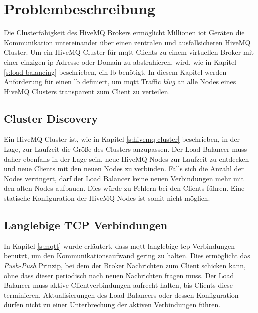 \section{Problembeschreibung} \label{s:problem}
Die Clusterfähigkeit des HiveMQ Brokers ermöglicht Millionen \ac{iot} Geräten die Kommunikation untereinander über einen zentralen und ausfallsicheren HiveMQ Cluster.
Um ein HiveMQ Cluster für \ac{mqtt} Clients zu einem virtuellen Broker mit einer einzigen \ac{ip} Adresse oder Domain zu abstrahieren, wird, wie in Kapitel \ref{s:load-balancing} beschrieben, ein \acl{lb} benötigt.
In diesem Kapitel werden Anforderung für einen \acl{lb} definiert, um \ac{mqtt} Traffic \textit{klug} an alle Nodes eines HiveMQ Clusters transparent zum Client zu verteilen.

\subsection{Cluster Discovery} \label{sp:cluster-discovery}
Ein HiveMQ Cluster ist, wie in Kapitel \ref{s:hivemq-cluster} beschrieben, in der Lage, zur Laufzeit die Grö{\ss}e des Clusters anzupassen. Der Load Balancer muss daher ebenfalls in der Lage sein, neue HiveMQ Nodes zur Laufzeit zu entdecken und neue Clients mit den neuen Nodes zu verbinden. Falls sich die Anzahl der Nodes verringert, darf der Load Balancer keine neuen Verbindungen mehr mit den alten Nodes aufbauen. Dies würde zu Fehlern bei den Clients führen.
Eine statische Konfiguration der HiveMQ Nodes ist somit nicht möglich.

\subsection{Langlebige TCP Verbindungen}
In Kapitel \ref{s:mqtt} wurde erläutert, dass \ac{mqtt} langlebige \ac{tcp} Verbindungen benutzt, um den Kommunikationsaufwand gering zu halten.
Dies ermöglicht das \textit{Push-Push} Prinzip, bei dem der Broker Nachrichten zum Client schicken kann, ohne dass dieser periodisch nach neuen Nachrichten fragen muss.
Der Load Balancer muss aktive Clientverbindungen aufrecht halten, bis Clients diese terminieren.
Aktualisierungen des Load Balancers oder dessen Konfiguration dürfen nicht zu einer Unterbrechung der aktiven Verbindungen führen.

